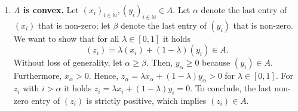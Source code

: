 \documentclass{article}
\begin{document}
\begin{enumerate}
    \item \textbf{$A$ is convex.} Let $(x_i)_{i \in \mathbb{N}}, (y_i)_{i \in \mathbb{N}} \in A$. Let $\alpha$ denote the last entry of $(x_i)$ that is non-zero; let $\beta$ denote the last entry of $(y_i)$ that is non-zero. We want to show that for all $\lambda \in [0,1]$ it holds
    $$
        (z_i) = \lambda(x_i) + (1-\lambda) (y_i) \in A.
    $$
    Without loss of generality, let $\alpha \geq \beta$. Then, $y_\alpha \geq 0$ because $(y_i) \in A$. Furthermore, $x_\alpha > 0$. Hence, $z_\alpha = \lambda x_\alpha + (1-\lambda) y_\alpha > 0$ for $\lambda \in [0,1]$. For $z_i$ with $i > \alpha$ it holds $z_i = \lambda x_i + (1- \lambda)y_i = 0$. To conclude, the last non-zero entry of $(z_i)$ is strictly positive, which implies $(z_i) \in A$.


\end{enumerate}
\end{document}
